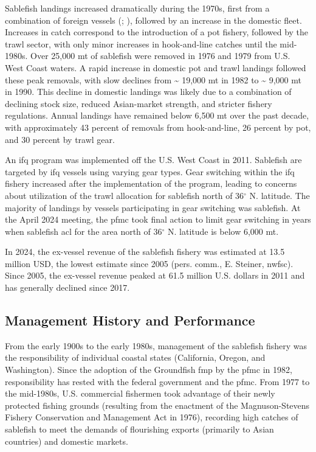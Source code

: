 \documentclass[
  english,
]{article}
\begin{document}
Sablefish landings increased dramatically during the 1970s, first from a
combination of foreign vessels
(;
), followed by an
increase in the domestic fleet. Increases in catch correspond to the
introduction of a pot fishery, followed by the trawl sector, with only
minor increases in hook-and-line catches until the mid-1980s. Over
25,000 mt of sablefish were removed in 1976 and 1979 from U.S. West
Coast waters. A rapid increase in domestic pot and trawl landings
followed these peak removals, with slow declines from \textasciitilde{}
19,000 mt in 1982 to \textasciitilde{} 9,000 mt in 1990. This decline in
domestic landings was likely due to a combination of declining stock
size, reduced Asian-market strength, and stricter fishery regulations.
Annual landings have remained below 6,500 mt over the past decade, with
approximately 43 percent of removals from hook-and-line, 26 percent by
pot, and 30 percent by trawl gear.

An \gls{ifq} program was implemented off the U.S. West Coast in 2011.
Sablefish are targeted by \gls{ifq} vessels using varying gear types.
Gear switching within the \gls{ifq} fishery increased after the
implementation of the program, leading to concerns about utilization of
the trawl allocation for sablefish north of 36\(^{\circ}\) N. latitude.
The majority of landings by vessels participating in gear switching was
sablefish. At the April 2024 meeting, the \gls{pfmc} took final action
to limit gear switching in years when sablefish \gls{acl} for the area
north of 36\(^{\circ}\) N. latitude is below 6,000 mt.

In 2024, the ex-vessel revenue of the sablefish fishery was estimated at
13.5 million USD, the lowest estimate since 2005 (pers. comm., E.
Steiner, \gls{nwfsc}). Since 2005, the ex-vessel revenue peaked at 61.5
million U.S. dollars in 2011 and has generally declined since 2017.

\subsection{Management History and
Performance}\label{management-history-and-performance}

From the early 1900s to the early 1980s, management of the sablefish
fishery was the responsibility of individual coastal states (California,
Oregon, and Washington). Since the adoption of the Groundfish \gls{fmp}
by the \gls{pfmc} in 1982, responsibility has rested with the federal
government and the \gls{pfmc}. From 1977 to the mid-1980s, U.S.
commercial fishermen took advantage of their newly protected fishing
grounds (resulting from the enactment of the Magnuson-Stevens Fishery
Conservation and Management Act in 1976), recording high catches of
sablefish to meet the demands of flourishing exports (primarily to Asian
countries) and domestic markets.
\end{document}
